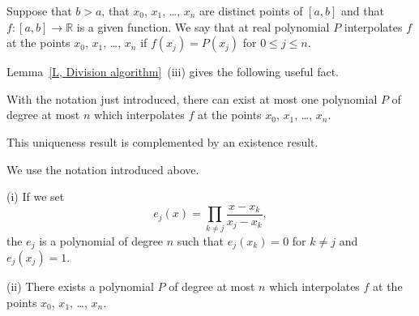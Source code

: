 Suppose that $b>a$, that $x_{0}$, $x_{1}$, \dots, $x_{n}$
are distinct points of $[a,b]$ and that
$f:[a,b]\rightarrow{\mathbb R}$ is a given function.
We say that at real polynomial $P$ interpolates $f$
at the points $x_{0}$, $x_{1}$, \dots, $x_{n}$
if $f(x_{j})=P(x_{j})$ for $0\leq j\leq n$.

Lemma~\ref{L, Division algorithm}~(iii) gives the following useful fact.
\begin{lemma}\label{L, interpolation unique}
With the notation just introduced, there can exist
at most one polynomial $P$ of degree at most $n$ which
interpolates $f$ at the points $x_{0}$, $x_{1}$, \dots, $x_{n}$.
\end{lemma}
This uniqueness result is complemented by an existence
result.
\begin{lemma} We use the notation introduced above.

(i) If we set
\[e_{j}(x)=\prod_{k\neq j}\frac{x-x_{k}}{x_{j}-x_{k}},\]
the $e_{j}$ is a polynomial of degree $n$ such that
$e_{j}(x_{k})=0$ for $k\neq j$ and $e_{j}(x_{j})=1$.

(ii) There exists a polynomial $P$ of degree at most $n$ which
interpolates $f$ at the points $x_{0}$, $x_{1}$, \dots, $x_{n}$.
\end{lemma}

